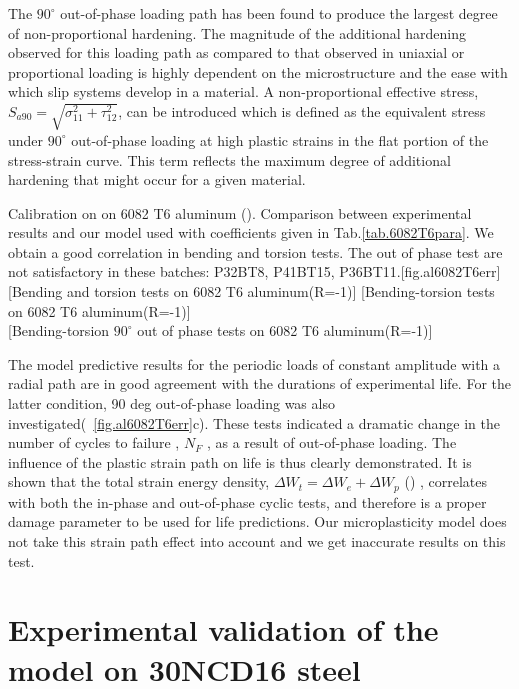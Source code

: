 \documentclass[3p,times,procedia,number]{elsarticle}
\newcommand{\figref}[1]{\figurename~\ref{#1}}
\begin{document}
The $90^\circ$ out-of-phase loading path has been found to produce the largest degree of non-proportional hardening. The magnitude of the additional hardening observed for this loading path as compared to that observed in uniaxial or proportional loading is highly dependent on the microstructure and the ease with which slip systems develop in a material. A non-proportional effective stress, $S_{a90}=\sqrt{\sigma_{11}^2+\tau_{12}^2}$, can be introduced which is defined as the equivalent stress under $90^\circ$ out-of-phase loading at high plastic strains in the flat portion of the stress-strain curve. This term reflects the maximum degree of additional hardening that might occur for a given material.



\begin{Figure}[!h]{Calibration on on 6082 T6 aluminum (\cite{susmel2003multiaxial}). Comparison between experimental results and our model used with coefficients given in Tab.\ref{tab.6082T6para}. We obtain a good correlation in bending and torsion tests. The out of phase test are not satisfactory in these batches: P32BT8, P41BT15, P36BT11.}[fig.al6082T6err]
	[Bending and torsion tests on 6082 T6 aluminum(R=-1)]
	[Bending-torsion tests on 6082 T6 aluminum(R=-1)]
	\\
	[Bending-torsion $90^\circ$ out of phase tests on 6082 T6 aluminum(R=-1)]
\end{Figure}

The model predictive results for the periodic loads of constant amplitude with a radial path are in good agreement with the durations of experimental life. For the latter condition, 90 deg out-of-phase loading was also investigated(\figref{fig.al6082T6err}c). These tests indicated a dramatic change in the number of cycles to failure , $N_F$ , as a result of out-of-phase loading. The influence of the plastic strain path on life is thus clearly demonstrated. It is shown that the total strain energy density, $\Delta W_t = \Delta W_e+ \Delta W_p$ (\cite{ellyin1991phase}) , correlates with both the in-phase and out-of-phase cyclic tests, and therefore is a proper damage parameter to be used for life predictions. Our microplasticity model does not take this strain path effect into account and we get inaccurate results on this test.



\clearpage
\section{Experimental validation of the model on 30NCD16 steel}
\end{document}
